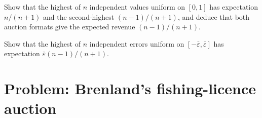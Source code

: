 \begin{exercise}[$\star\star\star$]\label{exo:b2:bayesian-games:11}
Show that the highest of $n$ independent values uniform on $[0, 1]$ has expectation $n/(n + 1)$ and the second-highest $(n -
1)/(n + 1)$, and deduce that both auction formats give the expected revenue $(n - 1)/(n + 1)$.
\end{exercise}

\begin{exercise}[$\star\star\star$]\label{exo:b2:bayesian-games:12}
Show that the highest of $n$ independent errors uniform on $[-\bar\varepsilon, \bar\varepsilon]$ has expectation $\bar\varepsilon(n - 1)/(n + 1)$.
\end{exercise}

\section{Problem: Brenland's fishing-licence auction}\label{sec:b2:bayesian-games:problem}

